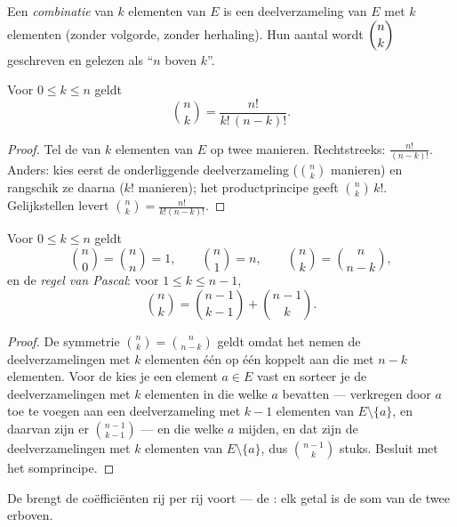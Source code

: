 \begin{definition}[Combinaties]\label{def:g12:comb:combination}
Een \emph{combinatie} van $k$ elementen van $E$ is een
deelverzameling van $E$ met $k$ elementen (zonder volgorde, zonder
herhaling). Hun aantal wordt $\dbinom{n}{k}$
geschreven en gelezen als ``$n$ boven $k$''.
\end{definition}

\begin{theorem}\label{thm:g12:comb:binomformula}
Voor $0 \leq k \leq n$ geldt
\[
\binom{n}{k} = \frac{n!}{k!\,(n-k)!} .
\]
\end{theorem}

\begin{proof}
Tel de  van $k$ elementen van $E$ op twee manieren. Rechtstreeks:
$\frac{n!}{(n-k)!}$. Anders: kies eerst de onderliggende deelverzameling
($\binom nk$ manieren) en rangschik ze daarna ($k!$ manieren); het
productprincipe geeft $\binom{n}{k}\,k!$. Gelijkstellen levert
$\binom nk = \frac{n!}{k!(n-k)!}$.
\end{proof}

\begin{proposition}[Basisidentiteiten]\label{prop:g12:comb:identities}
Voor $0 \leq k \leq n$ geldt
\[
\binom{n}{0} = \binom{n}{n} = 1, \qquad
\binom{n}{1} = n, \qquad
\binom{n}{k} = \binom{n}{n-k},
\]
en de \emph{regel van Pascal}: voor
$1 \leq k \leq n-1$,
\[
\binom{n}{k} = \binom{n-1}{k-1} + \binom{n-1}{k}.
\]
\end{proposition}

\begin{proof}
De symmetrie $\binom nk = \binom{n}{n-k}$ geldt omdat het  nemen de
deelverzamelingen met $k$ elementen één op één koppelt aan die met $n-k$
elementen. Voor de  kies je een element $a \in E$ vast en
sorteer je de deelverzamelingen met $k$ elementen in die welke $a$ bevatten
--- verkregen door $a$ toe te voegen aan een deelverzameling met $k-1$
elementen van $E \setminus \{a\}$, en daarvan zijn er $\binom{n-1}{k-1}$ ---
en die welke $a$ mijden, en dat zijn de deelverzamelingen met $k$ elementen
van $E \setminus \{a\}$, dus $\binom{n-1}{k}$ stuks. Besluit met het
somprincipe.
\end{proof}

De  brengt de coëfficiënten rij per rij voort --- de
\emph{}: elk getal is de som van de twee erboven.

